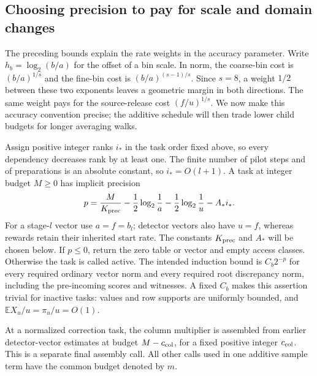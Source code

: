 \subsection{Choosing precision to pay for scale and domain changes}

The preceding bounds explain the rate weights in the accuracy parameter.
Write $h_b=\log_2(b/a)$ for the offset of a bin scale.
In norm, the coarse-bin cost is $(b/a)^{1/s}$ and the fine-bin cost is
$(b/a)^{(s-1)/s}$.  Since $s=8$, a weight $1/2$ between these two
exponents leaves a geometric margin in both directions.  The same
weight pays for the source-release cost $(f/u)^{1/s}$.  We now make
this accuracy convention precise; the additive schedule will then
trade lower child budgets for longer averaging walks.

Assign positive integer ranks $i_*$ in the task order fixed above, so every
dependency decreases rank by at least one.  The finite number of pilot steps and of
preparations is an absolute constant, so $i_*=O(l+1)$.  A task at integer
budget $M\ge0$ has implicit precision
\begin{equation}
 p=\frac{M}{K_{\rm prec}}-\frac12\log_2\frac1a
        -\frac12\log_2\frac1u-A_*i_*.
 \label{eq:est-precision}
\end{equation}
For a stage-$l$ vector use $a=f=b_l$; detector vectors also have $u=f$,
whereas rewards retain their inherited start rate.  The constants
$K_{\rm prec}$ and $A_*$ will be chosen below.  If $p\le0$, return the zero
table or vector and empty access classes.  Otherwise the task is called
active.  The intended induction bound is $C_b2^{-p}$ for every required
ordinary vector norm and every required root discrepancy norm, including
the pre-incoming scores and witnesses.  A fixed $C_b$ makes this assertion
trivial for inactive tasks: values and row supports are uniformly bounded,
and $\mathbb E X_u/u=\pi_u/u=O(1)$.

At a normalized correction task, the column multiplier is assembled from
earlier detector-vector estimates at budget $M-c_{\rm col}$, for a fixed
positive integer $c_{\rm col}$.  This is a separate final assembly call.
All other calls used in one additive sample term have the common
budget denoted by $m$.

